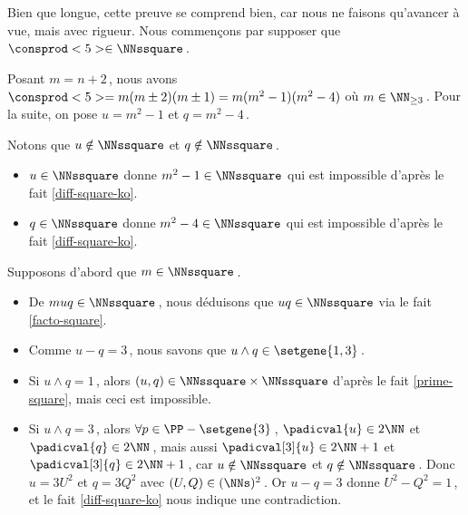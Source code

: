 Bien que longue, cette preuve se comprend bien, car nous ne faisons qu'avancer à vue, mais avec rigueur.
Nous commençons par supposer que $\consprod<5> \in \NNssquare$\,.
	
\smallskip

Posant $m = n+2$\,, nous avons $\consprod<5> = m (m \pm 2) (m \pm 1) = m(m^2 - 1)(m^2 - 4)$ où $m \in \NN_{\geq 3}$\,.
Pour la suite, on pose $u = m^2 - 1$ et $q = m^2 - 4$\,.

\medskip
	
Notons que $u \notin \NNssquare$ et $q \notin \NNssquare$\,.
\begin{itemize}
	\item $u \in \NNssquare$ donne $m^2 - 1 \in \NNssquare$ qui est impossible d'après le fait \ref{diff-square-ko}.

	\item $q \in \NNssquare$ donne $m^2 - 4 \in \NNssquare$ qui est impossible d'après le fait \ref{diff-square-ko}.
\end{itemize}

\medskip
	
Supposons d'abord que $m \in \NNssquare$\,.
%
\begin{itemize}
	\item De $muq \in \NNssquare$\,, nous déduisons que $uq \in \NNssquare$ via le fait \ref{facto-square}.

	\item Comme $u - q = 3$\,, nous savons que $u \wedge q \in \setgene{1, 3}$\,.

	\item Si $u \wedge q = 1$\,, 
	alors $(u, q) \in \NNssquare \times \NNssquare$ d'après le fait \ref{prime-square}, mais ceci est impossible.

	\item Si $u \wedge q = 3$\,, 
	alors $\forall p \in \PP - \setgene{3}$\,, 
	$\padicval{u} \in 2 \NN$ et $\padicval{q} \in 2 \NN$\,,
	mais aussi $\padicval[3]{u} \in 2 \NN + 1$ et $\padicval[3]{q} \in 2 \NN + 1$\,, car  $u \notin \NNssquare$ et $q \notin \NNssquare$\,.
	Donc 
	$u = 3 U^2$ et $q = 3 Q^2$ avec $(U, Q) \in ( \NNs )^2$\,.
	Or $u - q = 3$ donne $U^2 - Q^2 = 1$\,, et le fait \ref{diff-square-ko} nous indique une contradiction.
\end{itemize}
	
\medskip
	
